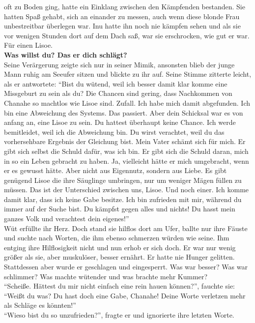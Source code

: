 oft zu Boden ging, hatte ein Einklang zwischen den Kämpfenden bestanden. Sie hatten Spaß gehabt, 
sich an einander zu messen, auch wenn diese blonde Frau unbestreitbar überlegen war. Inu hatte ihn 
noch nie kämpfen sehen und als sie vor wenigen Stunden dort auf dem Dach saß, war sie erschrocken, 
wie gut er war. Für einen Lisoe. \\
\textbf{Was willst du? Das er dich schlägt?}\\
Seine Verärgerung zeigte sich nur in seiner Mimik, ansonsten blieb der junge Mann ruhig am Seeufer 
sitzen und blickte zu ihr auf. Seine Stimme zitterte leicht, als er antwortete: ``Bist du wütend, 
weil ich besser damit klar komme eine Missgeburt zu sein als du? Die Chancen sind gering, dass 
Nachkommen von Chanahe so machtlos wie Lisoe sind. Zufall. Ich habe mich damit abgefunden. Ich bin 
eine Abweichung des Systems. Das passiert. Aber dein Schicksal war es von anfang an, eine Lisoe zu 
sein. Du hattest überhaupt keine Chance. Ich werde bemitleidet, weil ich die Abweichung bin. Du 
wirst verachtet, weil du das vorhersehbare Ergebnis der Gleichung bist. Mein Vater schämt sich für 
mich. Er gibt sich selbst die Schuld dafür, was ich bin. Er gibt sich die Schuld daran, mich in so 
ein Leben gebracht zu haben. Ja, vielleicht hätte er mich umgebracht, wenn er es gewusst hätte. 
Aber nicht aus Eigennutz, sondern aus Liebe. Es gibt genügend Lisoe die ihre Säuglinge umbringen, 
nur um weniger Mägen füllen zu müssen. Das ist der Unterschied zwischen uns, Lisoe. Und noch einer. 
Ich komme damit klar, dass ich keine Gabe besitze. Ich bin zufrieden mit mir, während du immer auf 
der Suche bist. Du kämpfst gegen alles und nichts! Du hasst mein ganzes Volk und verachtest dein 
eigenes!''\\
Wüt erfüllte ihr Herz. Doch stand sie hilflos dort am Ufer, ballte nur ihre Fäuste und suchte nach 
Worten, die ihm ebenso schmerzen würden wie seine. Ihm entging ihre Hilflosigkeit nicht und nun 
erhob er sich doch. Er war nur wenig größer als sie, aber muskulöser, besser ernährt. Er hatte nie 
Hunger gelitten. Stattdessen aber wurde er geschlagen und eingesperrt. Was war besser? Was war 
schlimmer? Was machte wütender und was brachte mehr Kummer?\\
``Scheiße. Hättest du mir nicht einfach eine rein hauen können?'', fauchte sie: ``Weißt du was? Du 
hast doch eine Gabe, Chanahe! Deine Worte verletzen mehr als Schläge es könnten!''\\
``Wieso bist du so unzufrieden?'', fragte er und ignorierte ihre letzten Worte.\\

